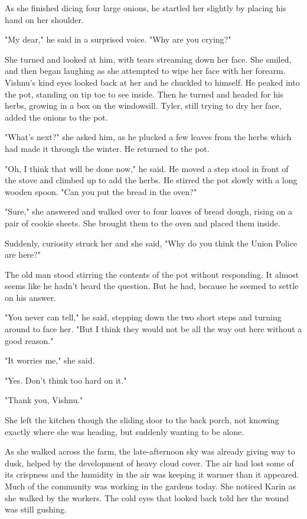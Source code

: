 \documentclass[courier]{sffms}
\begin{document}
As she finished dicing four large onions, he
startled her slightly by placing his hand on her
shoulder.

"My dear," he said in a surprised voice. "Why are
you crying?"

She turned and looked at him, with tears streaming
down her face. She smiled, and then began laughing
as she attempted to wipe her face with her forearm.
Vishnu's kind eyes looked back at her and he
chuckled to himself. 
He peaked into the pot, standing on tip toe to see
inside. Then he turned and headed for his herbs,
growing in a box on the windowsill.
Tyler, still trying to dry her face,
added the onions to the pot.

"What's next?" she asked him, as he plucked a few
leaves from the herbs which had made it through
the winter. He returned to the pot.

"Oh, I think that will be done now," he said. He moved
a step stool in front of the stove and climbed up to
add the herbs. He stirred the pot slowly with a long
wooden spoon. "Can you put the bread in the oven?"

"Sure," she answered and walked over to four loaves
of bread dough, rising on a pair of cookie sheets.
She brought them to the oven and placed them inside.

Suddenly, curiosity struck her and she said, "Why do
you think the Union Police are here?"

The old man stood stirring the contents of the pot
without responding. It almost seems like he hadn't
heard the question. But he had, because
 he seemed to settle
on his answer.

"You never can tell," he said, stepping down the two
short steps and turning around to face her. "But I
think they would not be all the way out here
without a good reason."

"It worries me," she said.

"Yes. Don't think too hard on it."

"Thank you, Vishnu."

She left the kitchen though the sliding door
to the back porch,
not knowing exactly where she was heading,
but suddenly wanting to be alone.

As she walked across the farm, the
late-afternoon sky was already giving
way to dusk, helped by the development
of heavy cloud cover. The air had lost
some of its crispness and the humidity
in the air was keeping it warmer than
it appeared. Much of the community
was working in the gardens today.
She noticed Karin as she walked by
the workers. The cold eyes that looked
back told her the wound was still
gushing.
\end{document}
